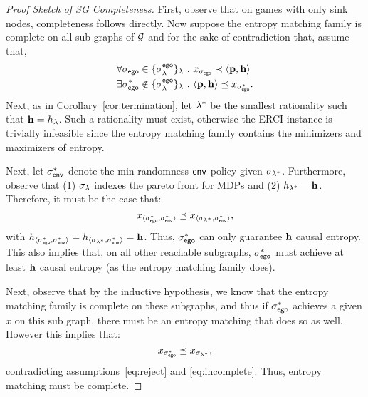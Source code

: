 \begin{proof}[Proof Sketch of SG Completeness]
  First, observe that on games with only sink nodes, completeness
  follows directly.
  Now suppose the entropy matching family is
  complete on all sub-graphs of $\mathcal{G}$ and for the sake of
  contradiction that, assume that,
  \begin{align}
    &\forall \sched_\pOne \in \{\sched^{\pOne}_\rat\}_\rat~.~ x_{\sched_{\pOne}} \prec \langle \scthreshold, \randomness \rangle\label{eq:reject}\\
    &\exists \sched_\pOne^* \notin \{\sched^{\pOne}_\rat\}_\rat~.~  \langle \scthreshold, \randomness \rangle \preceq x_{\sched_{\pOne}^*}\label{eq:incomplete}.
  \end{align}
  Next, as in Corollary~\ref{cor:termination}, let $\lambda^*$ be the smallest
  rationality such that $\mathbf{h} = h_\lambda$. Such a rationality must
  exist, otherwise the ERCI instance is trivially infeasible since the
  entropy matching family contains the minimizers and maximizers of entropy.


  Next, let
  $\sigma_{\mathsf{env}}^*$ denote the min-randomness $\mathsf{env}$-policy given
  $\sigma_{\lambda^*}$.
  Furthermore, observe that  (1) $\sigma_\lambda$ indexes the pareto front for MDPs and (2) $h_{\lambda^*} = \mathbf{h}$. Therefore, it must be
  the case that:
  \begin{equation}
    x_{\langle \sigma_{\mathsf{ego}}^*, \sigma_{\mathsf{env}}^* \rangle} \preceq x_{\langle \sigma_{\lambda^*}, \sigma_{\mathsf{env}}^* \rangle},
  \end{equation}
  with
  $h_{\langle \sigma_{\mathsf{ego}}^*, \sigma_{\mathsf{env}}^* \rangle} =
  h_{\langle \sigma_{\lambda^*}, \sigma_{\mathsf{env}}^* \rangle} =
  \mathbf{h}$.  Thus, $\sigma_{\mathsf{ego}}^*$ can only guarantee
  $\mathbf{h}$ causal entropy. This also implies that, on all other
  reachable subgraphs, $\sigma_{\mathsf{ego}}^*$ must
  achieve at least $\mathbf{h}$ causal entropy (as the entropy matching family does).
  

  Next, observe that by the inductive hypothesis, we know
  that the entropy matching family is complete on these subgraphs, and
  thus if $\sigma_{\mathsf{ego}}^*$ achieves a given $x$ on this sub graph,
  there must be an entropy matching that does so as well.
  However this implies that:
  \begin{equation}
    x_{\sigma_{\mathsf{ego}}^*} \preceq x_{\sigma_{\lambda^*}},
  \end{equation}
  contradicting
  assumptions~\eqref{eq:reject} and \eqref{eq:incomplete}.  Thus,
  entropy matching must be complete.
\end{proof}


